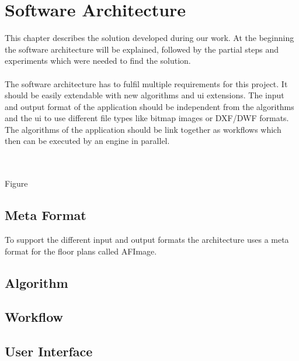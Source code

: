 \section{Software Architecture}
This chapter describes the solution developed during our work. At the beginning the software architecture will be explained, followed by the partial steps and experiments which were needed to find the solution.
\\\\
The software architecture has to fulfil multiple requirements for this project. It should be easily extendable with new algorithms and ui extensions. The input and output format of the application should be independent from the algorithms and the ui to use different file types like bitmap images or DXF/DWF formats. The algorithms of the application should be link together as workflows which then can be executed by an engine in parallel.

\\\\
Figure



\subsection{Meta Format}
To support the different input and output formats the architecture uses a meta format for the
floor plans called AFImage.
\subsection{Algorithm}
\subsection{Workflow}

\subsection{User Interface}
